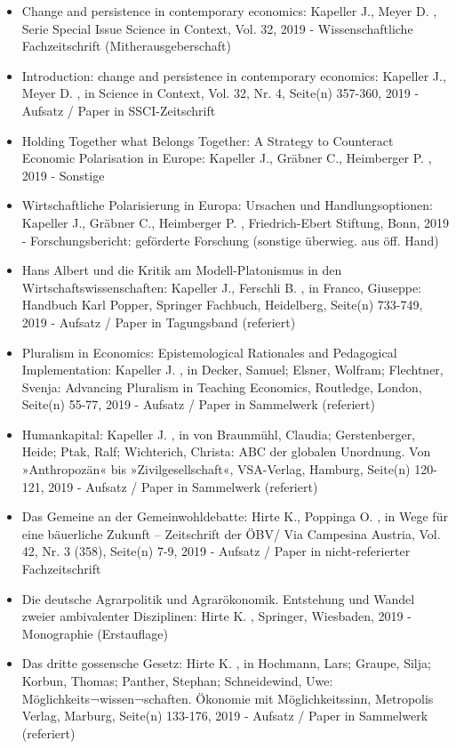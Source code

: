 \begin{itemize}
	 \item Change and persistence in contemporary economics: Kapeller J., Meyer D. , Serie Special Issue Science in Context, Vol. 32, 2019 - Wissenschaftliche Fachzeitschrift (Mitherausgeberschaft)
	 \item Introduction: change and persistence in contemporary economics: Kapeller J., Meyer D. , in Science in Context, Vol. 32, Nr. 4, Seite(n) 357-360, 2019 - Aufsatz / Paper in SSCI-Zeitschrift
	 \item Holding Together what Belongs Together: A Strategy to Counteract Economic Polarisation in Europe: Kapeller J., Gräbner C., Heimberger P. , 2019 - Sonstige
	 \item Wirtschaftliche Polarisierung in Europa: Ursachen und Handlungsoptionen: Kapeller J., Gräbner C., Heimberger P. , Friedrich-Ebert Stiftung, Bonn, 2019 - Forschungsbericht: geförderte Forschung (sonstige überwieg. aus öff. Hand)
	 \item Hans Albert und die Kritik am Modell-Platonismus in den Wirtschaftswissenschaften: Kapeller J., Ferschli B. , in Franco, Giuseppe: Handbuch Karl Popper, Springer Fachbuch, Heidelberg, Seite(n) 733-749, 2019 - Aufsatz / Paper in Tagungsband (referiert)
	 \item Pluralism in Economics: Epistemological Rationales and Pedagogical Implementation: Kapeller J. , in Decker, Samuel; Elsner, Wolfram; Flechtner, Svenja: Advancing Pluralism in Teaching Economics, Routledge, London, Seite(n) 55-77, 2019 - Aufsatz / Paper in Sammelwerk (referiert)
	 \item Humankapital: Kapeller J. , in von Braunmühl, Claudia; Gerstenberger, Heide; Ptak, Ralf; Wichterich, Christa: ABC der globalen Unordnung. Von »Anthropozän« bis »Zivilgesellschaft«, VSA-Verlag, Hamburg, Seite(n) 120-121, 2019 - Aufsatz / Paper in Sammelwerk (referiert)
	 \item Das Gemeine an der Gemeinwohldebatte: Hirte K., Poppinga O. , in Wege für eine bäuerliche Zukunft – Zeitschrift der ÖBV/ Via Campesina Austria, Vol. 42, Nr. 3 (358), Seite(n) 7-9, 2019 - Aufsatz / Paper in nicht-referierter Fachzeitschrift
	 \item Die deutsche Agrarpolitik und Agrarökonomik. Entstehung und Wandel zweier ambivalenter Disziplinen: Hirte K. , Springer, Wiesbaden, 2019 - Monographie (Erstauflage)
	 \item Das dritte gossensche Gesetz: Hirte K. , in Hochmann, Lars; Graupe, Silja; Korbun, Thomas; Panther, Stephan; Schneidewind, Uwe: Möglichkeits¬wissen¬schaften. Ökonomie mit Möglichkeitssinn, Metropolis Verlag, Marburg, Seite(n) 133-176, 2019 - Aufsatz / Paper in Sammelwerk (referiert)

\end{itemize}
